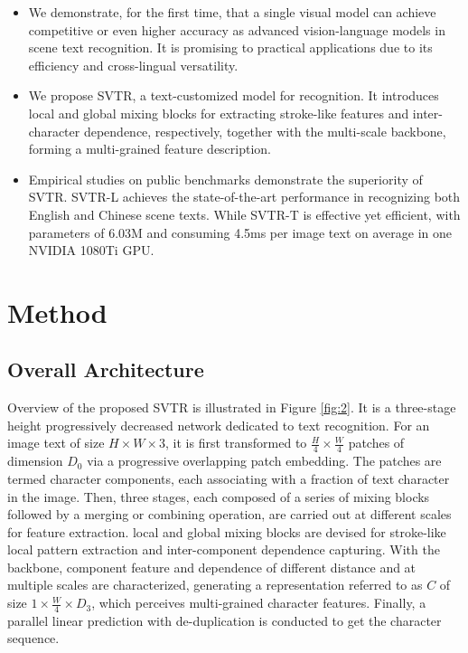 \documentclass{article}
\begin{document}
\begin{itemize}
\item We demonstrate, for the first time, that a single visual model can achieve competitive or even higher accuracy as advanced vision-language models in scene text recognition. It is promising to practical applications due to its efficiency and cross-lingual versatility.


\item We propose SVTR, a text-customized model for recognition. It introduces local and global mixing blocks for extracting stroke-like features and inter-character dependence, respectively, together with the multi-scale backbone, forming a multi-grained feature description.

\item Empirical studies on public benchmarks demonstrate the superiority of SVTR. SVTR-L achieves the state-of-the-art performance in recognizing both English and Chinese scene texts. While SVTR-T is effective yet efficient, with parameters of 6.03M and consuming 4.5ms per image text on average in one NVIDIA 1080Ti GPU.
\end{itemize}


\section{Method}

\subsection{Overall Architecture}
Overview of the proposed SVTR is illustrated in Figure \ref{fig:2}. It is a three-stage height progressively decreased network dedicated to text recognition. For an image text of size $H \times  W \times  3$, it is first transformed to $\frac{H}{4} \times  \frac{W}{4}$ patches of dimension $D_0$ via a progressive overlapping patch embedding. The patches are termed character components, each associating with a fraction of text character in the image. Then, three stages, each composed of a series of mixing blocks followed by a merging or combining operation, are carried out at different scales for feature extraction. local and global mixing blocks are devised for stroke-like local pattern extraction and inter-component dependence capturing. With the backbone, component feature and dependence of different distance and at multiple scales are characterized, generating a representation referred to as $C$ of size $1 \times \frac{W}{4} \times D_3$, which perceives multi-grained character features. Finally, a parallel linear prediction with de-duplication is conducted to get the character sequence.
\end{document}
